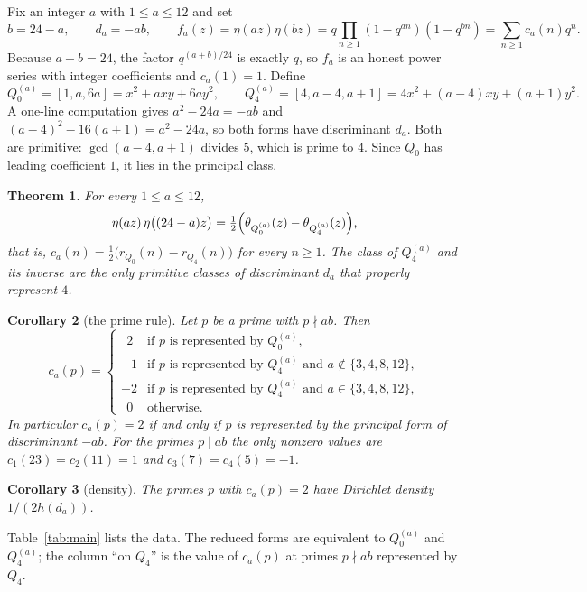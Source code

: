 \documentclass[11pt]{amsart}
\newtheorem{theorem}{Theorem}
\newtheorem{maincor}[theorem]{Corollary}
\theoremstyle{definition}
\theoremstyle{remark}
\newcommand{\form}[3]{[#1,#2,#3]}
\begin{document}
Fix an integer $a$ with $1\le a\le 12$ and set
\[
b=24-a,\qquad d_a=-ab,\qquad f_a(z)=\eta(az)\eta(bz)=q\prod_{n\ge1}(1-q^{an})(1-q^{bn})=\sum_{n\ge1}c_a(n)q^n .
\]
Because $a+b=24$, the factor $q^{(a+b)/24}$ is exactly $q$, so $f_a$ is an honest power series with integer coefficients and $c_a(1)=1$. Define
\[
Q_0^{(a)}=\form{1}{a}{6a}=x^2+axy+6ay^2,\qquad Q_4^{(a)}=\form{4}{a-4}{a+1}=4x^2+(a-4)xy+(a+1)y^2 .
\]
A one-line computation gives $a^2-24a=-ab$ and $(a-4)^2-16(a+1)=a^2-24a$, so both forms have discriminant $d_a$. Both are primitive: $\gcd(a-4,a+1)$ divides $5$, which is prime to $4$. Since $Q_0$ has leading coefficient $1$, it lies in the principal class.

\begin{theorem}\label{thm:A}
For every $1\le a\le 12$,
\[
\eta(az)\,\eta\bigl((24-a)z\bigr)=\tfrac12\Bigl(\theta_{Q_0^{(a)}}(z)-\theta_{Q_4^{(a)}}(z)\Bigr),
\]
that is, $c_a(n)=\tfrac12\bigl(r_{Q_0}(n)-r_{Q_4}(n)\bigr)$ for every $n\ge1$. The class of $Q_4^{(a)}$ and its inverse are the only primitive classes of discriminant $d_a$ that properly represent $4$.
\end{theorem}

\begin{maincor}[the prime rule]\label{cor:B}
Let $p$ be a prime with $p\nmid ab$. Then
\[
c_a(p)=\begin{cases}
\ \ 2 & \text{if $p$ is represented by $Q_0^{(a)}$},\\
-1 & \text{if $p$ is represented by $Q_4^{(a)}$ and $a\notin\{3,4,8,12\}$},\\
-2 & \text{if $p$ is represented by $Q_4^{(a)}$ and $a\in\{3,4,8,12\}$},\\
\ \ 0 & \text{otherwise.}
\end{cases}
\]
In particular $c_a(p)=2$ if and only if $p$ is represented by the principal form of discriminant $-ab$. For the primes $p\mid ab$ the only nonzero values are $c_1(23)=c_2(11)=1$ and $c_3(7)=c_4(5)=-1$.
\end{maincor}

\begin{maincor}[density]\label{cor:C}
The primes $p$ with $c_a(p)=2$ have Dirichlet density $1/(2h(d_a))$.
\end{maincor}

Table~\ref{tab:main} lists the data. The reduced forms are equivalent to $Q_0^{(a)}$ and $Q_4^{(a)}$; the column ``on $Q_4$'' is the value of $c_a(p)$ at primes $p\nmid ab$ represented by $Q_4$.
\end{document}
